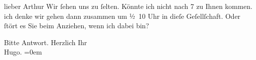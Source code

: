 \pstart{}lieber Arthur\pend\vspace{0.5em}
\pstart
           Wir{ }ſehen uns zu{ }ſelten. Könnte ich nicht \label{K_L00538-1v}\label{K_L00538-1} nach
                  7 zu Ihnen kommen. ich denke wir gehen dann zusammen um ½ 10
                  Uhr in dieſe Geſellſchaft. Oder{ }ſtört es Sie beim Anziehen, wenn ich dabei
               bin?\pend
           
\pstart
           Bitte Antwort. Herzlich Ihr{\\[\baselineskip]}\spacefill\mbox{Hugo.}\pend
           \leftskip=0em{}\endnumbering{}  \newcommand{\dateiname}{L00538}\newcommand{\titel}{Hugo von Hofmannsthal an Arthur Schnitzler, 13. 3. 1896}\newcommand{\editorInnen}{Martin Anton Müller und Gerd-Hermann Susen}
